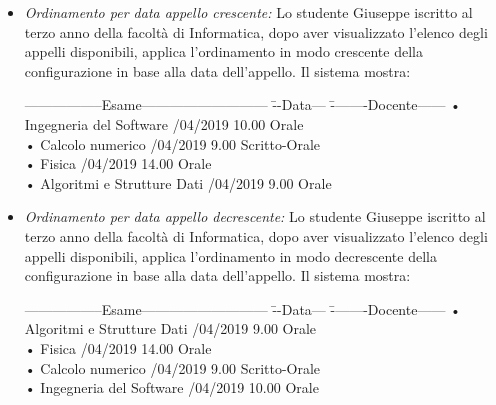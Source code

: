 \begin{itemize}
	\item \textit{Ordinamento per data appello crescente:}
	Lo studente Giuseppe iscritto al terzo anno della facoltà di Informatica, dopo aver visualizzato l'elenco degli appelli disponibili, applica l'ordinamento in modo crescente della configurazione in base alla data dell’appello. Il sistema mostra:
	\begin{tabbing}
		\hspace{1cm}-----------------Esame--------------------------- \= --Data--- \= --------Docente------ \kill
		\hspace{1cm} • Ingegneria del Software /04/2019 10.00 \> \hspace{2cm} Orale \\
		\hspace{1cm} • Calcolo numerico /04/2019 9.00 \> \hspace{2cm} Scritto-Orale \\
		\hspace{1cm} • Fisica /04/2019 14.00\> \hspace{2cm} Orale  \\
		\hspace{1cm} • Algoritmi e Strutture Dati /04/2019 9.00\> \hspace{2cm} Orale \\
	\end{tabbing} 
	
	\item \textit{Ordinamento per data appello decrescente:}
	Lo studente Giuseppe iscritto al terzo anno della facoltà di Informatica, dopo aver visualizzato l'elenco degli appelli disponibili, applica l'ordinamento in modo decrescente della configurazione in base alla data dell’appello. Il sistema mostra:
	\begin{tabbing}
		\hspace{1cm}-----------------Esame--------------------------- \= --Data--- \= --------Docente------ \kill
		\hspace{1cm} • Algoritmi e Strutture Dati /04/2019 9.00\> \hspace{2cm} Orale \\
		\hspace{1cm} • Fisica /04/2019 14.00\> \hspace{2cm} Orale  \\
		\hspace{1cm} • Calcolo numerico /04/2019 9.00 \> \hspace{2cm} Scritto-Orale \\
		\hspace{1cm} • Ingegneria del Software /04/2019 10.00 \> \hspace{2cm} Orale \\
	\end{tabbing} 
	

\end{itemize}
